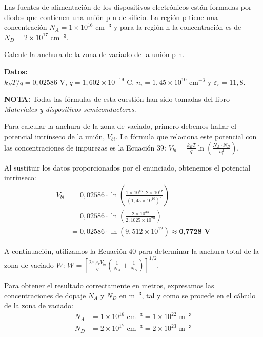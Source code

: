 \documentclass[11pt, a4paper]{article}
\newenvironment{problem}[1][Cuestión]{
	\vspace{0.5cm}
	\noindent{\Large\bfseries #1} \par\vspace{0.5cm}
}{
	\vspace{0.5cm}
}
\begin{document}
	\begin{problem}[Cuestión 5]
		Las fuentes de alimentación de los dispositivos electrónicos están formadas por diodos que contienen una unión p-n de silicio. La región p tiene una concentración $N_A = 1 \times 10^{16} \text{ cm}^{-3}$  y para la región n la concentración es de $N_D = 2 \times 10^{17} \text{ cm}^{-3}$.

		Calcule la anchura de la zona de vaciado de la unión p-n.

		\textbf{Datos:} $k_B T/q= 0,02586 \text{ V}, \, q=1,602 \times 10^{-19} \text{ C}, \, n_i = 1,45 \times 10^{10} \text{ cm}^{-3} \text{ y } \varepsilon_r = 11,8$.

		{ \color{blue} 
			\textbf{NOTA:} Todas las fórmulas de esta cuestión han sido tomadas del libro \textit{Materiales y dispositivos semiconductores}.
		}

		{ \color{blue} 
			Para calcular la anchura de la zona de vaciado, primero debemos hallar el potencial intrínseco de la unión, $V_{bi}$. La fórmula que relaciona este potencial con las concentraciones de impurezas es la Ecuación 39: $V_{bi} = \frac{k_B T}{q} \ln \left( \frac{N_A \cdot N_D}{n_i^2} \right)$.

			Al sustituir los datos proporcionados por el enunciado, obtenemos el potencial intrínseco:
			\begin{align*}
				V_{bi} &= 0,02586 \cdot \ln \left( \frac{1 \times 10^{16} \cdot 2 \times 10^{17}}{(1,45 \times 10^{10})^2} \right) \\
				&= 0,02586 \cdot \ln \left( \frac{2 \times 10^{33}}{2,1025 \times 10^{20}} \right) \\
				&= 0,02586 \cdot \ln (9,512 \times 10^{12}) \approx \textbf{0,7728 V}
			\end{align*}

			A continuación, utilizamos la Ecuación 40 para determinar la anchura total de la zona de vaciado $W$: $W = \left[ \frac{2 \varepsilon_0 \varepsilon_r V_{bi}}{q} \left( \frac{1}{N_A} + \frac{1}{N_D} \right) \right]^{1/2}$.

			Para obtener el resultado correctamente en metros, expresamos las concentraciones de dopaje $N_A$ y $N_D$ en $\text{m}^{-3}$, tal y como se procede en el cálculo de la zona de vaciado:
			\begin{align*}
				N_A &= 1 \times 10^{16} \text{ cm}^{-3} = 1 \times 10^{22} \text{ m}^{-3} \\
				N_D &= 2 \times 10^{17} \text{ cm}^{-3} = 2 \times 10^{23} \text{ m}^{-3}
			\end{align*}

}
\end{problem}
\end{document}
